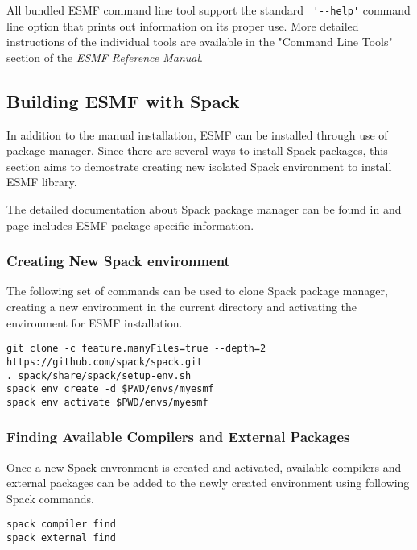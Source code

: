 All bundled ESMF command line tool support the standard \verb+ '--help'+ command
line option that prints out information on its proper use. More detailed
instructions of the individual tools are available in the "Command Line Tools"
section of the {\it ESMF Reference Manual}.

\subsection{Building ESMF with Spack}

In addition to the manual installation, ESMF can be installed through use of  package manager. Since there are several ways to install Spack packages, this section aims to demostrate creating new isolated Spack environment to install ESMF library.

The detailed documentation about Spack package manager can be found in  and  page includes ESMF package specific information.

\subsubsection{Creating New Spack environment}

The following set of commands can be used to clone Spack package manager, creating a new environment in the current directory and activating the environment for ESMF installation.

\begin{verbatim}
git clone -c feature.manyFiles=true --depth=2 https://github.com/spack/spack.git
. spack/share/spack/setup-env.sh
spack env create -d $PWD/envs/myesmf
spack env activate $PWD/envs/myesmf
\end{verbatim}

\subsubsection{Finding Available Compilers and External Packages}

Once a new Spack envronment is created and activated, available compilers and external packages can be added to the newly created environment using following Spack commands.

\begin{verbatim}
spack compiler find
spack external find
\end{verbatim}

